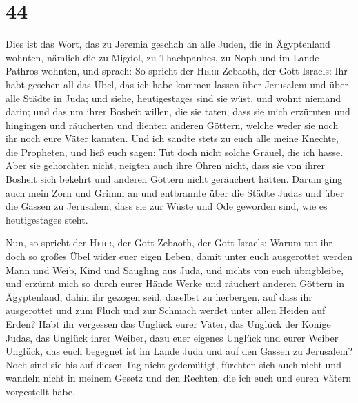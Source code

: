 \hypertarget{section-43}{%
\section{44}\label{section-43}}

 Dies ist das Wort, das zu Jeremia geschah an alle Juden,
die in Ägyptenland wohnten, nämlich die zu Migdol, zu Thachpanhes, zu
Noph und im Lande Pathros wohnten, und sprach:  So spricht
der \textsc{Herr} Zebaoth, der Gott Israels: Ihr habt gesehen all das
Übel, das ich habe kommen lassen über Jerusalem und über alle Städte in
Juda; und siehe, heutigestages sind sie wüst, und wohnt niemand darin;
 und das um ihrer Bosheit willen, die sie taten, dass sie
mich erzürnten und hingingen und räucherten und dienten anderen Göttern,
welche weder sie noch ihr noch eure Väter kannten.  Und
ich sandte stets zu euch alle meine Knechte, die Propheten, und ließ
euch sagen: Tut doch nicht solche Gräuel, die ich hasse. 
Aber sie gehorchten nicht, neigten auch ihre Ohren nicht, dass sie von
ihrer Bosheit sich bekehrt und anderen Göttern nicht geräuchert hätten.
 Darum ging auch mein Zorn und Grimm an und entbrannte
über die Städte Judas und über die Gassen zu Jerusalem, dass sie zur
Wüste und Öde geworden sind, wie es heutigestages steht.

 Nun, so spricht der \textsc{Herr}, der Gott Zebaoth, der
Gott Israels: Warum tut ihr doch so großes Übel wider euer eigen Leben,
damit unter euch ausgerottet werden Mann und Weib, Kind und Säugling aus
Juda, und nichts von euch übrigbleibe,  und erzürnt mich
so durch eurer Hände Werke und räuchert anderen Göttern in Ägyptenland,
dahin ihr gezogen seid, daselbst zu herbergen, auf dass ihr ausgerottet
und zum Fluch und zur Schmach werdet unter allen Heiden auf Erden?
 Habt ihr vergessen das Unglück eurer Väter, das Unglück
der Könige Judas, das Unglück ihrer Weiber, dazu euer eigenes Unglück
und eurer Weiber Unglück, das euch begegnet ist im Lande Juda und auf
den Gassen zu Jerusalem?  Noch sind sie bis auf diesen
Tag nicht gedemütigt, fürchten sich auch nicht und wandeln nicht in
meinem Gesetz und den Rechten, die ich euch und euren Vätern vorgestellt
habe.

